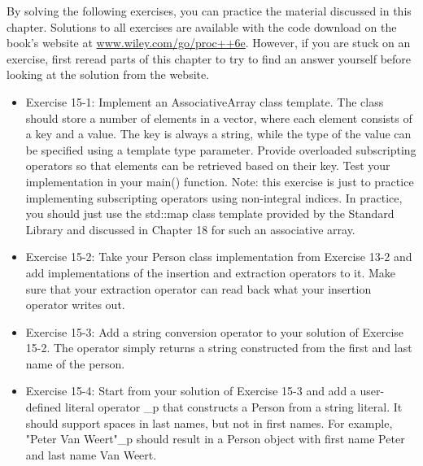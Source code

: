 By solving the following exercises, you can practice the material discussed in this chapter. Solutions to all exercises are available with the code download on the book’s website at \url{www.wiley.com/go/proc++6e}. However, if you are stuck on an exercise, first reread parts of this chapter to try to find an answer yourself before looking at the solution from the website.

\begin{itemize}
\item
Exercise 15-1: Implement an AssociativeArray class template. The class should store a number of elements in a vector, where each element consists of a key and a value. The key is always a string, while the type of the value can be specified using a template type parameter. Provide overloaded subscripting operators so that elements can be retrieved based on their key. Test your implementation in your main() function. Note: this exercise is just to practice implementing subscripting operators using non-integral indices. In practice, you should just use the std::map class template provided by the Standard Library and discussed in Chapter 18 for such an associative array.

\item
Exercise 15-2: Take your Person class implementation from Exercise 13-2 and add implementations of the insertion and extraction operators to it. Make sure that your extraction operator can read back what your insertion operator writes out.

\item
Exercise 15-3: Add a string conversion operator to your solution of Exercise 15-2. The operator simply returns a string constructed from the first and last name of the person.

\item
Exercise 15-4: Start from your solution of Exercise 15-3 and add a user-defined literal operator \_p that constructs a Person from a string literal. It should support spaces in last names, but not in first names. For example, "Peter Van Weert"\_p should result in a Person object with first name Peter and last name Van Weert.
\end{itemize}












